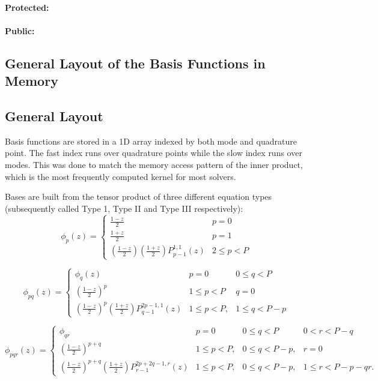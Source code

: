 \paragraph{Protected:}

\paragraph{Public:}


\subsection{General Layout of the Basis Functions in Memory}

\subsection{General Layout}

Basis functions are stored in a 1D array indexed by both mode and quadrature point. The fast index runs over quadrature points while the slow index runs over modes. This was done to match the memory access pattern of the inner product, which is the most frequently computed kernel for most solvers.

Bases are built from the tensor product of three different equation types (subsequently called Type 1, Type II and Type III respectively):
\begin{equation}
    \phi_{p}(z) =
    \begin{cases}
        \frac{1 - z}{2} & p = 0 \\
        \frac{1 + z}{2} & p = 1 \\
        \left(\frac{1-z}{2}\right)\left(\frac{1+z}{2}\right) P_{p-1}^{1,1}(z) & 2 \leq p < P
    \end{cases}
\end{equation}

\[
    \phi_{pq}(z) = \left\{
    \begin{array}{lll}
        \phi_{q}(z) & p = 0 & 0 \leq q < P \\
        \left(\frac{1 - z}{2}\right)^p & 1 \leq p < P & q = 0 \\
        \left(\frac{1-z}{2}\right)^p \left(\frac{1+z}{2}\right) P_{q-1}^{2p-1,1}(z) & 1 \leq p < P, & 1 \leq q < P - p
    \end{array}\right.
\]

\[
    \phi_{pqr}(z) = \left\{
    \begin{array}{llll}
        \phi_{qr} & p = 0 & 0 \leq q < P & 0 < r < P - q \\
        \left(\frac{1-z}{2}\right)^{p+q} & 1 \leq p < P, & 0 \leq q < P - p, & r = 0 \\
        \left(\frac{1 - z}{2}\right)^{p + q} \left(\frac{1+z}{2}\right) P_{r-1}^{2p + 2q - 1, r}(z) & 1 \leq p < P, & 0 \leq q < P - p, & 1 \leq r < P - p - qr.
    \end{array}\right.
\]

